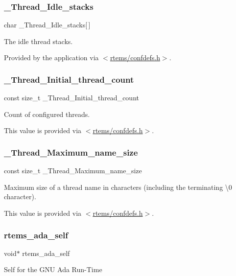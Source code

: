 \subsubsection{\texorpdfstring{\_Thread\_Idle\_stacks}{\_Thread\_Idle\_stacks}}
{\footnotesize\ttfamily char \+\_\+\+Thread\+\_\+\+Idle\+\_\+stacks\mbox{[}$\,$\mbox{]}}



The idle thread stacks. 

Provided by the application via $<$\mbox{\hyperlink{confdefs_8h}{rtems/confdefs.\+h}}$>$. \mbox{\label{group__RTEMSScoreThread_ga1626b8af19f26d5f6874121bb3c1cc05}} 
\subsubsection{\texorpdfstring{\_Thread\_Initial\_thread\_count}{\_Thread\_Initial\_thread\_count}}
{\footnotesize\ttfamily const size\+\_\+t \+\_\+\+Thread\+\_\+\+Initial\+\_\+thread\+\_\+count}



Count of configured threads. 

This value is provided via $<$\mbox{\hyperlink{confdefs_8h}{rtems/confdefs.\+h}}$>$. \mbox{\label{group__RTEMSScoreThread_gae17e2d6bbad850c7adffc4515ac56087}} 
\subsubsection{\texorpdfstring{\_Thread\_Maximum\_name\_size}{\_Thread\_Maximum\_name\_size}}
{\footnotesize\ttfamily const size\+\_\+t \+\_\+\+Thread\+\_\+\+Maximum\+\_\+name\+\_\+size}



Maximum size of a thread name in characters (including the terminating \textquotesingle{}\textbackslash{}0\textquotesingle{} character). 

This value is provided via $<$\mbox{\hyperlink{confdefs_8h}{rtems/confdefs.\+h}}$>$. \mbox{\label{group__RTEMSScoreThread_ga2b3416f9db9d594d76db105d8a7ad343}} 
\subsubsection{\texorpdfstring{rtems\_ada\_self}{rtems\_ada\_self}}
{\footnotesize\ttfamily void$\ast$ rtems\+\_\+ada\+\_\+self}

Self for the G\+NU Ada Run-\/\+Time 